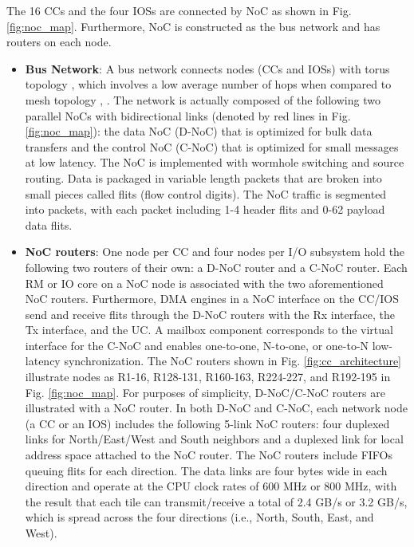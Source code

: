   The 16 CCs and the four IOSs are connected by NoC as shown in Fig. \ref{fig:noc_map}.
  Furthermore, NoC is constructed  as the bus network and has routers on each node.

  \begin{itemize}
    \setlength{\leftskip}{-5mm}
    \item \textbf{Bus Network}:
    A bus network connects nodes (CCs and IOSs) with torus topology \cite{dally2001route}, which  involves a low average number of hops when compared to mesh topology \cite{vangal200780}, \cite{taylor2002raw}.
    The network is actually composed of the following two parallel NoCs with bidirectional links (denoted by red lines in Fig. \ref{fig:noc_map}):
    the data NoC (D-NoC) that is optimized for bulk data transfers and the control NoC (C-NoC) that is optimized for small messages at low latency.
    The NoC is implemented with wormhole switching and source routing.
    Data is packaged in variable length packets that are broken into small pieces called flits (flow control digits).
    The NoC traffic is segmented into packets, with each packet including 1-4 header flits and 0-62 payload data flits.
    
    \item \textbf{NoC routers}:
    One node per CC and four nodes per I/O subsystem hold the following two routers of their own: a D-NoC router and a C-NoC router.
    Each RM or IO core on a NoC node is associated with the two aforementioned  NoC routers.
    Furthermore, DMA engines in a NoC interface on the CC/IOS send and receive flits through the D-NoC routers with the Rx interface, the Tx interface, and the UC.
    A mailbox component corresponds to the virtual interface for the C-NoC and enables one-to-one, N-to-one, or one-to-N low-latency synchronization.
    The NoC routers shown in Fig. \ref{fig:cc_architecture} illustrate nodes as R1-16, R128-131, R160-163, R224-227, and R192-195 in Fig. \ref{fig:noc_map}.
    For purposes of simplicity, D-NoC/C-NoC routers are illustrated with a NoC router.
    In both D-NoC and C-NoC, each network node (a CC or an IOS)  includes the following 5-link NoC routers:
    four duplexed links for North/East/West and South neighbors and a duplexed link for local address space attached to the NoC router.
    The NoC routers include FIFOs queuing flits for each direction.
    The data links are four bytes wide in each direction and operate at the CPU clock rates of 600 MHz or 800 MHz, with the result that each tile can transmit/receive a total of 2.4 GB/s or 3.2 GB/s, which is spread across the four directions (i.e., North, South, East, and West).
  \end{itemize}  
  

